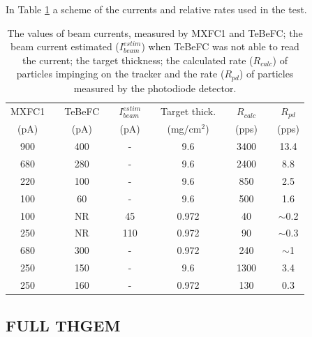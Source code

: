 \documentclass[a4paper, 11 pt]{report}
\begin{document}
In Table \ref{tab:current_rate} a scheme of the currents and relative rates used in the test.

\begin{table} [!h]
	\begin{center}
		\renewcommand{\arraystretch}{1.2}
		\begin{tabular} {ccccccccccc}
			MXFC1   & & TeBeFC  & & $I_{beam}^{estim}$ & & Target thick.	& & $R_{calc}$ & & $R_{pd}$ \\
			(pA)  	& &   (pA)  & &       (pA)		   & &  (mg/$\mbox{cm}^2$)&&  (pps)   & &   (pps)   \\
			\toprule[0.1em]
			900	& & 400	& &	-		& & 9.6		& & 3400	& & 13.4		\\
			680	& &	280	& & -		& & 9.6		& &	2400	& & 8.8			\\
			220	& & 100	& & - 		& & 9.6		& & 850		& & 2.5			\\
			100	& & 60	& & - 		& & 9.6		& & 500 	& & 1.6			\\
			100	& & NR	& & 45 		& & 0.972	& & 40  	& & $\sim$0.2	\\
			250	& & NR	& & 110		& & 0.972	& & 90  	& & $\sim$0.3	\\
			680	& &	300	& & -		& & 0.972	& &	240		& & $\sim$1		\\
			250	& & 150	& & - 		& & 9.6		& & 1300	& & 3.4			\\
			250	& & 160	& & - 		& & 0.972	& & 130 	& & 0.3			\\
			\bottomrule[0.1em]
		\end{tabular}
	\end{center}
	\caption{The values of beam currents, measured by MXFC1 and TeBeFC; the beam current estimated ($I_{beam}^{estim}$) when TeBeFC was not able to read the current; the target thickness; the calculated rate ($R_{calc}$) of particles impinging on the tracker and the rate ($R_{pd}$) of particles measured by the photodiode detector.} \label{tab:current_rate}
\end{table}

\clearpage
\subsection{FULL THGEM}
\end{document}
